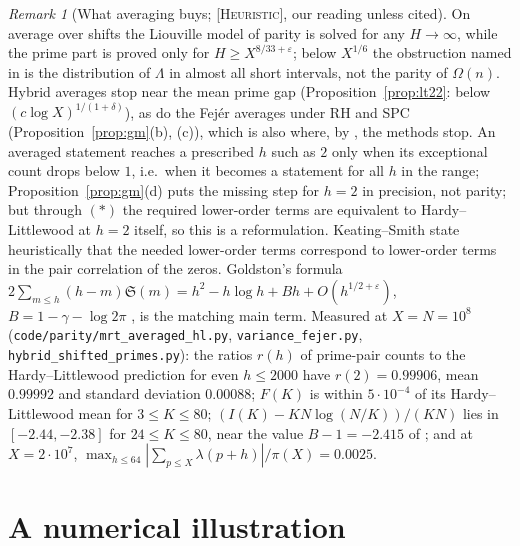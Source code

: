 \documentclass[11pt]{amsart}
\theoremstyle{definition}
\theoremstyle{remark}
\newtheorem{remark}[theorem]{Remark}
\newcommand{\lbl}[1]{\textup{\textsc{[#1]}}}
\begin{document}
\begin{remark}[What averaging buys; \lbl{Heuristic}, our reading unless cited]\label{rem:mrt17}
On average over shifts the Liouville model of parity is solved for any
$H\to\infty$, while the prime part is proved only for $H\ge X^{8/33+\varepsilon}$;
below $X^{1/6}$ the obstruction named in \cite[p.~5]{MRT17} is the distribution
of $\Lambda$ in almost all short intervals, not the parity of $\Omega(n)$. Hybrid
averages stop near the mean prime gap (Proposition~\ref{prop:lt22}: below
$(c\log X)^{1/(1+\delta)}$), as do the
Fej\'er averages under RH and SPC (Proposition~\ref{prop:gm}(b), (c)), which is
also where, by \cite[footnote~4]{MRT17}, the methods stop. An averaged
statement reaches a prescribed $h$ such as $2$ only when its exceptional count
drops below $1$, i.e.\ when it becomes a statement for all $h$ in the range;
Proposition~\ref{prop:gm}(d) puts the missing step for $h=2$ in precision, not
parity; but through $(*)$ the required lower-order terms are equivalent to
Hardy--Littlewood at $h=2$ itself, so this is a reformulation. Keating--Smith \cite{KS19} state heuristically that the needed
lower-order terms correspond to lower-order terms in the pair correlation of
the zeros. Goldston's formula $2\sum_{m\le h}(h-m)\mathfrak
S(m)=h^2-h\log h+Bh+O(h^{1/2+\varepsilon})$, $B=1-\gamma-\log2\pi$ \cite[(47)]{MS04},
is the matching main term. Measured at $X=N=10^8$
(\texttt{code/}\allowbreak\texttt{parity/}\allowbreak\texttt{mrt\_averaged\_hl.py},
\texttt{variance\_fejer.py}, \texttt{hybrid\_shifted\_primes.py}): the ratios
$r(h)$ of prime-pair counts to the Hardy--Littlewood prediction for even $h\le
2000$ have $r(2)=0.99906$, mean $0.99992$ and standard deviation $0.00088$;
$F(K)$ is within $5\cdot10^{-4}$ of its Hardy--Littlewood mean for $3\le K\le80$;
$(I(K)-KN\log(N/K))/(KN)$ lies in $[-2.44,-2.38]$ for $24\le K\le80$, near the
value $B-1=-2.415$ of \cite[Thm.~3]{MS04}; and at $X=2\cdot10^7$,
$\max_{h\le64}|\sum_{p\le X}\lambda(p+h)|/\pi(X)=0.0025$.
\end{remark}

\section{A numerical illustration}\label{sec:num}
\end{document}
